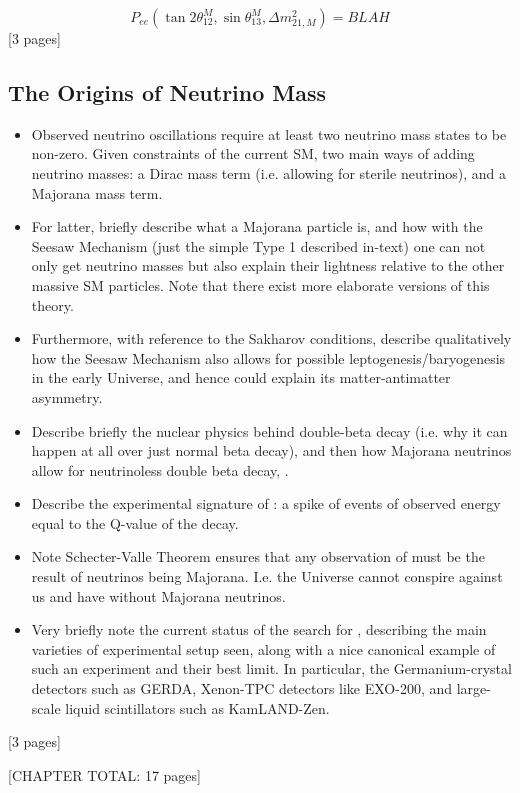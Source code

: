 {\begin{equation}\label{eq:pee_msw}
    P_{ee}\left(\tan2\theta^{M}_{12}, \sin\theta^{M}_{13}, \Delta m^{2}_{21,M}\right) = BLAH
\end{equation}
[3 pages]
\subsection{The Origins of Neutrino Mass}
\begin{itemize}
    \item Observed neutrino oscillations require at least two neutrino mass states to be non-zero. Given constraints of the current SM, two main ways of adding neutrino masses: a Dirac mass term (i.e. allowing for sterile neutrinos), and a Majorana mass term.
    \item For latter, briefly describe what a Majorana particle is, and how with the Seesaw Mechanism (just the simple Type 1 described in-text) one can not only get neutrino masses but also explain their lightness relative to the other massive SM particles. Note that there exist more elaborate versions of this theory.
    \item Furthermore, with reference to the Sakharov conditions, describe qualitatively how the Seesaw Mechanism also allows for possible leptogenesis/baryogenesis in the early Universe, and hence could explain its matter-antimatter asymmetry.
    \item Describe briefly the nuclear physics behind double-beta decay (i.e. why it can happen at all over just normal beta decay), and then how Majorana neutrinos allow for neutrinoless double beta decay, \onbb{}.
    \item Describe the experimental signature of \onbb{}: a spike of events of observed energy equal to the Q-value of the decay.
    \item Note Schecter-Valle Theorem ensures that any observation of \onbb{} must be the result of neutrinos being Majorana. I.e. the Universe cannot conspire against us and have \onbb{} without Majorana neutrinos.
    \item Very briefly note the current status of the search for \onbb{}, describing the main varieties of experimental setup seen, along with a nice canonical example of such an experiment and their best limit. In particular, the Germanium-crystal detectors such as GERDA, Xenon-TPC detectors like EXO-200, and large-scale liquid scintillators such as KamLAND-Zen.
\end{itemize}
[3 pages]

[CHAPTER TOTAL: 17 pages]
}